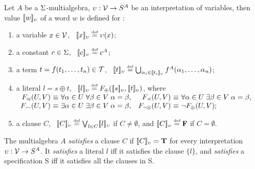  \begin{definition} \label {def:semantics}
Let $A$ be a \(\Funcs\)-multialgebra, \(\upsilon:\Vars \to S^A\) be an
interpretation of variables, then value \(\Value w\) of a word $w$ is
defined for :
\begin{enumerate}\smallerspaces
\item a variable \(x\in\Vars\), \ \(\Value x \Def \upsilon(x)\);
  \label {semantics-v}
\item a constant $c\in\Funcs$, \ \(\Value c \Def c^A\);
\item a term \(t=f(\List tn,)\in \Terms\), \
  \(\Value t \Def \bigcup_{{\alpha_i} \in \Value{t_i}} f^A(\List{\alpha}n,)\);
  \label {semantics1}
\item a literal \(l=s\oplus t\), \ \(\Value l \Def
  F_\oplus(\Value s, \Value t)\), where
  \vspace{1ex}\newline \(
  \begin{array}{r@{\ \equiv\ } l@{\quad}r@{\ \equiv\ } l}
   F_{\Eq}(U,V)  & \forall \alpha\in U\; \forall \beta\in V\;\alpha=\beta, &
   F_{\Incl}(U,V)& \forall \alpha\in U\; \exists \beta\in V\;\alpha=\beta,\\
   F_{\Int}(U,V) & \exists \alpha\in U\; \exists \beta\in V\;\alpha=\beta, &
   F_{\neg\otimes}(U,V) & \neg F_\otimes(U,V);
  \end{array}\)
  \label {semantics3}
\item a clause \(C\), \ \(\Value C \Def 
  \bigvee_{l\in C} \Value{l} \) if \(C\neq \emptyset\), and \(\Value C \Def
  \false\) if $C=\emptyset$.
  \label {semantics4}
\end{enumerate}
\noindent
The multialgebra $A$ {\em satisfies} a clause $C$ if \(\Value C =
\true\) for every interpretation \(\upsilon:\Vars \to S^A\).
It {\em satisfies} a literal $l$ iff it satisfies the clause
\(\{ l\}\), and {\em satisfies} a specification \C S iff it satisfies all
the clauses in \C S.
\end{definition}


